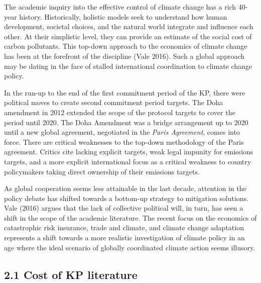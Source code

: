 \documentclass[
  10pt,
]{article}
\begin{document}
The academic inquiry into the effective control of climate change has a
rich 40-year history. Historically, holistic models seek to understand
how human development, societal choices, and the natural world integrate
and influence each other. At their simplistic level, they can provide an
estimate of the social cost of carbon pollutants. This top-down approach
to the economics of climate change has been at the forefront of the
discipline (Vale 2016). Such a global approach may be dating in the face
of stalled international coordination to climate change policy.

In the run-up to the end of the first commitment period of the KP, there
were political moves to create second commitment period targets. The
Doha amendment in 2012 extended the scope of the protocol targets to
cover the period until 2020. The Doha Amendment was a bridge arrangement
up to 2020 until a new global agreement, negotiated in the \emph{Paris
Agreement}, comes into force. There are critical weaknesses to the
top-down methodology of the Paris agreement. Critics cite lacking
explicit targets, weak legal impunity for emissions targets, and a more
explicit international focus as a critical weakness to country
policymakers taking direct ownership of their emissions targets.

As global cooperation seems less attainable in the last decade,
attention in the policy debate has shifted towards a bottom-up strategy
to mitigation solutions. Vale (2016) argues that the lack of collective
political will, in turn, has seen a shift in the scope of the academic
literature. The recent focus on the economics of catastrophic risk
insurance, trade and climate, and climate change adaptation represents a
shift towards a more realistic investigation of climate policy in an age
where the ideal scenario of globally coordinated climate action seems
illusory.

\hypertarget{cost-of-kp-literature}{%
\subsection{2.1 Cost of KP literature}\label{cost-of-kp-literature}}
\end{document}
